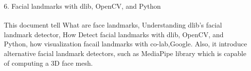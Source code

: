 \begin{itemize}
    6. Facial landmarks with dlib, OpenCV, and Python\cite{r20} \\
    \\This document tell What are face landmarks, Understanding dlib’s facial landmark detector, How Detect facial landmarks with dlib, OpenCV, and Python,
    how visualization facail landmarks with co-lab,Google.
    Also, it introduce alternative facial landmark detectors, such as MediaPipe library which is capable of computing a 3D face mesh.\\
    
\end{itemize}
